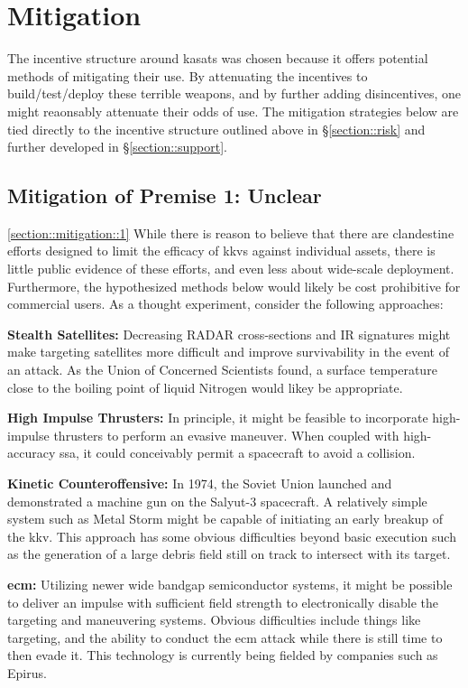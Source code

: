 \section{Mitigation}

The incentive structure around \acp{kasat} was chosen because it
offers potential methods of mitigating their use.  By attenuating the
incentives to build/test/deploy these terrible weapons, and by further
adding disincentives, one might reaonsably attenuate their odds of
use.  The mitigation strategies below are tied directly to the
incentive structure outlined above in \S\ref{section::risk} and
further developed in \S\ref{section::support}.

\subsection{Mitigation of Premise 1: Unclear}
\ref{section::mitigation::1}
While there is reason to believe that there are clandestine efforts
designed to limit the efficacy of \acp{kkv} against individual assets,
there is little public evidence of these efforts, and even less about
wide-scale deployment.  Furthermore, the hypothesized methods below
would likely be cost prohibitive for commercial users.  As a thought
experiment, consider the following approaches:

\textbf{Stealth Satellites:} Decreasing RADAR cross-sections and IR
signatures might make targeting satellites more difficult and improve
survivability in the event of an attack.  As the Union of Concerned
Scientists found, a surface temperature close to the boiling point of
liquid Nitrogen would likey be appropriate.\cite[p48]{abm-me-not}

\textbf{High Impulse Thrusters:} In principle, it might be feasible to
incorporate high-impulse thrusters to perform an evasive maneuver.
When coupled with high-accuracy \ac{ssa}, it could conceivably permit
a spacecraft to avoid a collision.

\textbf{Kinetic Counteroffensive:} In 1974, the Soviet Union launched
and demonstrated a machine gun on the Salyut-3 spacecraft.  A
relatively simple system such as Metal Storm might be capable of
initiating an early breakup of the \ac{kkv}.  This approach has some
obvious difficulties beyond basic execution such as the generation of
a large debris field still on track to intersect with its target.

\textbf{\acl{ecm}:} Utilizing newer wide bandgap semiconductor
systems, it might be possible to deliver an impulse with sufficient
field strength to electronically disable the  targeting and
maneuvering systems.  Obvious difficulties include things like
targeting, and the ability to conduct the \ac{ecm} attack while there
is still time to then evade it.  This technology is currently being
fielded by companies such as Epirus.\cite[epirus]{xxx}

